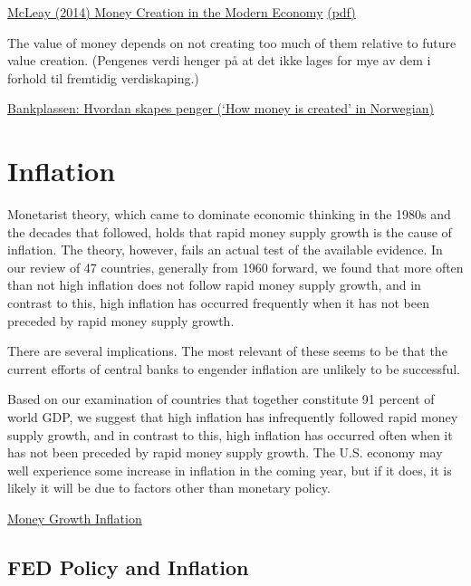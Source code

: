 \documentclass[
]{book}
\begin{document}
\href{https://www.bankofengland.co.uk/-/media/boe/files/quarterly-bulletin/2014/money-creation-in-the-modern-economy.pdf}{McLeay (2014) Money Creation in the Modern Economy}
\href{pdf/money-creation-in-the-modern-economy.pdf}{(pdf)}

The value of money depends on not creating too much of them relative to future value creation.
(Pengenes verdi henger på at det ikke lages for mye av dem i forhold til fremtidig verdiskaping.)

\href{https://bankplassen.norges-bank.no/2019/01/04/hvordan-skapes-penger/}{Bankplassen: Hvordan skapes penger (`How money is created' in Norwegian)}

\hypertarget{inflation}{%
\section{Inflation}\label{inflation}}

Monetarist theory, which came to dominate economic thinking in the 1980s and the decades that followed, holds that rapid money supply growth is the cause of inflation. The theory, however, fails an actual test of the available evidence. In our review of 47 countries, generally from 1960 forward, we found that more often than not high inflation does not follow rapid money supply growth, and in contrast to this, high inflation has occurred frequently when it has not been preceded by rapid money supply growth.

There are several implications. The most relevant of these seems to be that the current efforts of central banks to engender inflation are unlikely to be successful.

Based on our examination of countries that together constitute 91 percent of world GDP, we suggest that high inflation has infrequently followed rapid money supply growth, and in contrast to this, high inflation has occurred often when it has not been preceded by rapid money supply growth. The U.S. economy may well experience some increase in inflation in the coming year, but if it does, it is likely it will be due to factors other than monetary policy.

\href{https://evonomics.com/moneysupply/}{Money Growth Inflation}

\hypertarget{fed-policy-and-inflation}{%
\subsection{FED Policy and Inflation}\label{fed-policy-and-inflation}}
\end{document}
